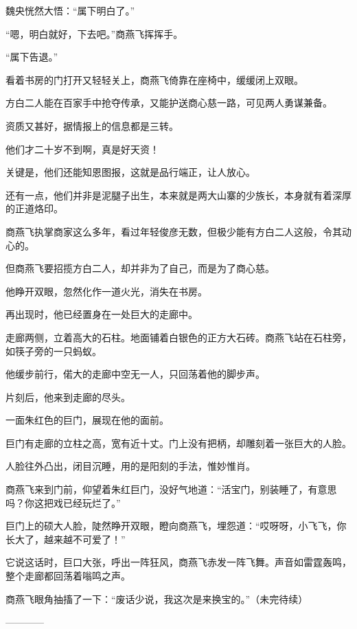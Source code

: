 \begin{this_body}
魏央恍然大悟：“属下明白了。”

“嗯，明白就好，下去吧。”商燕飞挥挥手。

“属下告退。”

看着书房的门打开又轻轻关上，商燕飞倚靠在座椅中，缓缓闭上双眼。

方白二人能在百家手中抢夺传承，又能护送商心慈一路，可见两人勇谋兼备。

资质又甚好，据情报上的信息都是三转。

他们才二十岁不到啊，真是好天资！

关键是，他们还能知恩图报，这就是品行端正，让人放心。

还有一点，他们并非是泥腿子出生，本来就是两大山寨的少族长，本身就有着深厚的正道烙印。

商燕飞执掌商家这么多年，看过年轻俊彦无数，但极少能有方白二人这般，令其动心的。

但商燕飞要招揽方白二人，却并非为了自己，而是为了商心慈。

他睁开双眼，忽然化作一道火光，消失在书房。

再出现时，他已经置身在一处巨大的走廊中。

走廊两侧，立着高大的石柱。地面铺着白银色的正方大石砖。商燕飞站在石柱旁，如筷子旁的一只蚂蚁。

他缓步前行，偌大的走廊中空无一人，只回荡着他的脚步声。

片刻后，他来到走廊的尽头。

一面朱红色的巨门，展现在他的面前。

巨门有走廊的立柱之高，宽有近十丈。门上没有把柄，却雕刻着一张巨大的人脸。

人脸往外凸出，闭目沉睡，用的是阳刻的手法，惟妙惟肖。

商燕飞来到门前，仰望着朱红巨门，没好气地道：“活宝门，别装睡了，有意思吗？你这把戏已经玩烂了。”

巨门上的硕大人脸，陡然睁开双眼，瞪向商燕飞，埋怨道：“哎呀呀，小飞飞，你长大了，越来越不可爱了！”

它说这话时，巨口大张，呼出一阵狂风，商燕飞赤发一阵飞舞。声音如雷霆轰鸣，整个走廊都回荡着嗡鸣之声。

商燕飞眼角抽搐了一下：“废话少说，我这次是来换宝的。”（未完待续）

------------

\end{this_body}

